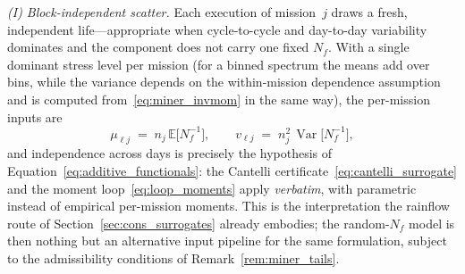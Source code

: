 \documentclass[11pt,a4paper]{article}
\theoremstyle{plain}
\theoremstyle{definition}
\theoremstyle{remark}
\begin{document}
\emph{(I) Block-independent scatter.}
Each execution of mission~$j$ draws a fresh, independent life---appropriate when cycle-to-cycle and day-to-day variability dominates and the component does not carry one fixed $N_f$.
With a single dominant stress level per mission (for a binned spectrum the means add over bins, while the variance depends on the within-mission dependence assumption and is computed from~\eqref{eq:miner_invmom} in the same way), the per-mission inputs are
\begin{equation}\label{eq:miner_routeI}
  \mu_{\ell j} \;=\; n_j\,\mathbb{E}\big[N_f^{-1}\big],
  \qquad
  v_{\ell j} \;=\; n_j^2\,\operatorname{Var}\big[N_f^{-1}\big],
\end{equation}
and independence across days is precisely the hypothesis of Equation~\eqref{eq:additive_functionals}: the Cantelli certificate~\eqref{eq:cantelli_surrogate} and the moment loop~\eqref{eq:loop_moments} apply \emph{verbatim}, with parametric instead of empirical per-mission moments.
This is the interpretation the rainflow route of Section~\ref{sec:cons_surrogates} already embodies; the random-$N_f$ model is then nothing but an alternative input pipeline for the same formulation, subject to the admissibility conditions of Remark~\ref{rem:miner_tails}.
\end{document}
